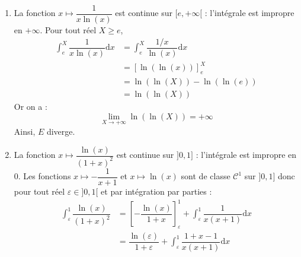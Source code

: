 \documentclass[a4paper,twoside,french,10pt]{VcCours}
\newcommand{\dx}{\text{d}x}
\begin{document}
\begin{enumerate}
$$ (x+1)-(x-1) = 2$$
Ainsi, pour tout réel $X \geq 2$,
\begin{align*}
\int_2^{X} \dfrac{1}{(x-1)(x+1)} \dx & = \dfrac{1}{2} \int_2^{X} \dfrac{(x+1)-(x-1)}{(x-1)(x+1)} \dx \\
& = \dfrac{1}{2} \int_2^{X} \dfrac{1}{x-1} - \dfrac{1}{x+1} \dx \\
& = \dfrac{1}{2} \left[ \ln(x-1)-\ln(x+1) \right]_2^X \\
& = \dfrac{1}{2} \left[ \ln \left( \dfrac{x-1}{x+1} \right) \right]_2^X \\
& = \dfrac{1}{2} \ln \left( \dfrac{X-1}{X+1} \right) - \dfrac{1}{2} \ln \left( \dfrac{1}{3} \right) \\
& =  \dfrac{1}{2} \ln \left( \dfrac{X-1}{X+1} \right) + \dfrac{\ln(3)}{2}  \\
\end{align*}
On sait que :
$$ \lim_{X \rightarrow + \infty}  \dfrac{X-1}{X+1} = 1$$
donc par continuité de la fonction logarithme népérien en $1$ :
$$  \lim_{X \rightarrow + \infty} \ln \left( \dfrac{X-1}{X+1} \right) = \ln(1) = 0$$
Ainsi,
$$ \lim_{X \rightarrow + \infty}  \dfrac{1}{2} \ln \left( \dfrac{X-1}{X+1} \right) + \dfrac{\ln(3)}{2}  = \dfrac{\ln(3)}{2}$$
On en déduit que $D$ converge et vaut $\dfrac{\ln(3)}{2} \cdot$
\item La fonction $x \mapsto \dfrac{1}{x\ln(x)}$ est continue sur $[e, + \infty[$ : l'intégrale est impropre en $+ \infty$. Pour tout réel $X \geq e$,
\begin{align*}
\int_{e}^{X} \dfrac{1}{x\ln(x)} \dx & = \int_{e}^{X} \dfrac{1/x}{\ln(x)} \dx \\
& = \left[ \ln(\ln(x)) \right]_e^X \\
& = \ln(\ln(X))- \ln(\ln(e)) \\
& = \ln(\ln(X))
\end{align*}
Or on a :
$$ \lim_{X \rightarrow + \infty} \ln(\ln(X)) = + \infty$$
Ainsi, $E$ diverge.
\item La fonction $x \mapsto \dfrac{\ln(x)}{(1+x)^2}$ est continue sur $]0,1]$ : l'intégrale est impropre en $0$. Les fonctions $x \mapsto - \dfrac{1}{x+1}$ et $x \mapsto \ln(x)$ sont de classe $\mathcal{C}^1$ sur $]0,1]$ donc pour tout réel $\varepsilon \in ]0,1[$ et par intégration par parties :
\begin{align*}
\int_{\varepsilon}^1 \dfrac{\ln(x)}{(1+x)^2} & = \left[- \dfrac{\ln(x)}{1+x} \right]_{\varepsilon}^1 + \int_{\varepsilon}^1 \dfrac{1}{x(x+1)} \dx \\
& = \dfrac{\ln(\varepsilon)}{1+\varepsilon} +\int_{\varepsilon}^1 \dfrac{1+x-1}{x(x+1)} \dx \\

\end{align*}
\end{enumerate}
\end{document}
